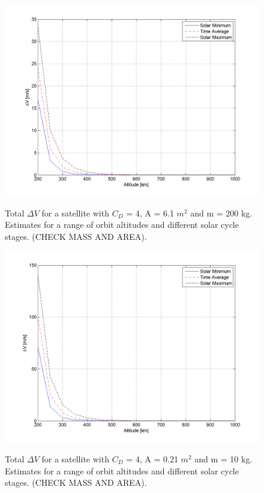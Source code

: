 \begin{figure}[h!]
\centering
\includegraphics[width=0.95\textheight, angle=90]{img/deltaVEmitter.png}
\label{fig:deltaVGraph1}
\caption{Total $\Delta V$ for a satellite with $C_D$ = 4, A = 6.1 $m^2$ and m = 200 kg. Estimates for a range of orbit altitudes and different solar cycle stages. (CHECK MASS AND AREA).}
\end{figure}

\begin{figure}[h!]
\centering
\includegraphics[width=0.95\textheight, angle=90]{img/deltaVReceiver.png}
\label{fig:deltaVGraph2}
\caption{Total $\Delta V$ for a satellite with $C_D$ = 4, A = 0.21 $m^2$ and m = 10 kg. Estimates for a range of orbit altitudes and different solar cycle stages. (CHECK MASS AND AREA).}
\end{figure}   

